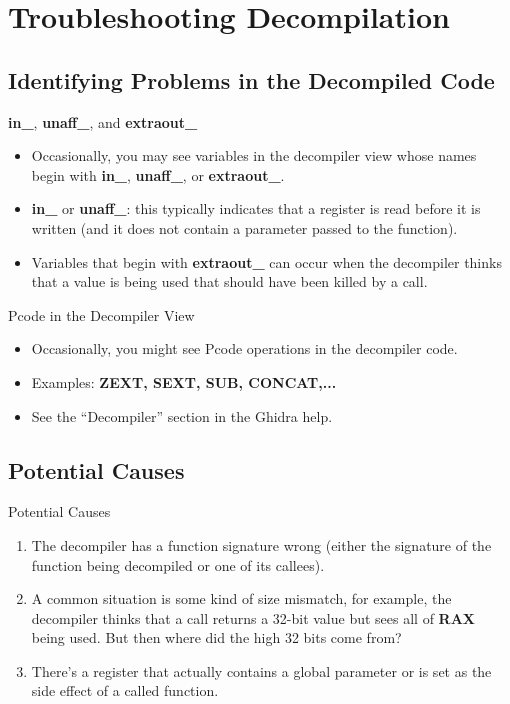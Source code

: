 \documentclass{beamer}
\begin{document}
\section{Troubleshooting Decompilation}

\subsection{Identifying Problems in the Decompiled Code}

\begin{frame}
\begin{block}{\textbf{in\_}, \textbf{unaff\_}, and \textbf{extraout\_}}
\begin{itemize}
\item Occasionally, you may see variables in the decompiler view whose names begin with \textbf{in\_}, \textbf{unaff\_}, or \textbf{extraout\_}.
\item \textbf{in\_} or \textbf{unaff\_}: this typically indicates that a register is read before it is written (and it does not contain a parameter passed to the function).
\item Variables that begin with \textbf{extraout\_} can occur when the decompiler thinks that a value is being used that should have been killed by a call. 
\end{itemize}
\end{block}
\end{frame}

\begin{frame}
\begin{block}{Pcode in the Decompiler View}
\begin{itemize}
\item Occasionally, you might see Pcode operations in the decompiler code. 
\item Examples: \textbf{ZEXT, SEXT, SUB, CONCAT,...}
\item See the ``Decompiler'' section in the Ghidra help. 
\end{itemize}
\end{block}
\end{frame}

\subsection{Potential Causes}
\begin{frame}
\begin{block}{Potential Causes}
\begin{enumerate}
\item The decompiler has a function signature wrong (either the signature of the function being decompiled or one of its callees). 
\item A common situation is some kind of size mismatch, for example, the decompiler thinks that a call returns a 32-bit value but sees all of \textbf{RAX} being used.  
But then where did the high 32 bits come from?
\item There's a register that actually contains a global parameter or is set as the side effect of a called function.
\end{enumerate}
\end{block}
\end{frame}
\end{document}
